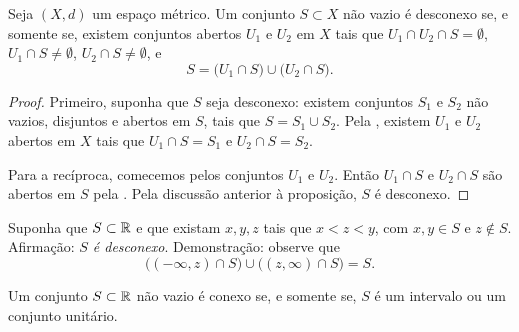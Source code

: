 \begin{prop}
Seja $(X,d)$ um espaço métrico.
Um conjunto $S \subset X$ não vazio é desconexo se, e somente se,
existem conjuntos abertos $U_1$ e $U_2$ em $X$ tais que
$U_1 \cap U_2 \cap S = \emptyset$,
$U_1 \cap S \neq \emptyset$,
$U_2 \cap S \neq \emptyset$, e
\begin{equation*}
S = 
\bigl( U_1 \cap S \bigr)
\cup
\bigl( U_2 \cap S \bigr) .
\end{equation*}
\end{prop}

\begin{myfigureht}
\caption{Subconjunto desconexo. Note que $U_1 \cap U_2$ não precisa
ser vazio, mas $U_1 \cap U_2 \cap S = \emptyset$.\label{fig:disconsubset}}
\end{myfigureht}


\begin{proof}
Primeiro, suponha que $S$ seja desconexo: existem conjuntos $S_1$ e $S_2$
não vazios, disjuntos e abertos em $S$, tais que $S = S_1 \cup S_2$.
Pela , existem $U_1$ e $U_2$ abertos em
$X$ tais que $U_1 \cap S = S_1$ e $U_2 \cap S = S_2$.

Para a recíproca, comecemos pelos conjuntos $U_1$ e $U_2$.
Então $U_1 \cap S$ e $U_2 \cap S$ são abertos em $S$ pela
.
Pela discussão anterior à proposição, $S$ é desconexo.
\end{proof}

\begin{example}
Suponha que $S \subset {\mathbb{R}}$ e que existam $x,y,z$ tais que $x < z < y$, com
$x,y \in S$ e $z \notin S$. Afirmação: \emph{$S$ é desconexo}. Demonstração:
observe que
\begin{equation*}
\bigl( (-\infty,z) \cap S \bigr)
\cup
\bigl( (z,\infty) \cap S \bigr)
= S .
\end{equation*}
\end{example}

\begin{prop}
Um conjunto $S \subset {\mathbb{R}}$ não vazio é conexo se, e somente se, $S$ é um
intervalo ou um conjunto unitário.
\end{prop}

